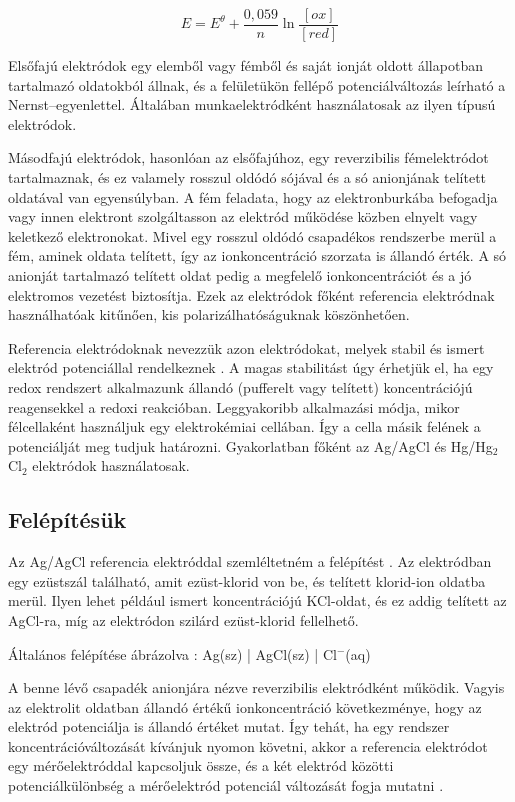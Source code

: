 \begin{equation}
E = E^\theta + \frac{0,059}{n}\ln \frac{[ox]}{[red]}
\label{eq:nernst}
\end{equation}

Elsőfajú elektródok egy elemből vagy fémből és saját ionját oldott állapotban tartalmazó oldatokból állnak, és a felületükön fellépő potenciálváltozás leírható a Nernst--egyenlettel. Általában munkaelektródként használatosak az ilyen típusú elektródok.

Másodfajú elektródok, hasonlóan az elsőfajúhoz, egy reverzibilis fémelektródot tartalmaznak, és ez valamely rosszul oldódó sójával és a só anionjának telített oldatával van egyensúlyban. A fém feladata, hogy az elektronburkába befogadja vagy innen elektront szolgáltasson az elektród működése közben elnyelt vagy keletkező elektronokat. Mivel egy rosszul oldódó csapadékos rendszerbe merül a fém, aminek oldata telített, így az ionkoncentráció szorzata is állandó érték. A só anionját tartalmazó telített oldat pedig a megfelelő ionkoncentrációt és a jó elektromos vezetést biztosítja. Ezek az elektródok főként referencia elektródnak használhatóak kitűnően, kis polarizálhatóságuknak köszönhetően.

Referencia elektródoknak nevezzük azon elektródokat, melyek stabil és ismert elektród potenciállal rendelkeznek \cite{allen2001electrochemical}. A magas stabilitást úgy érhetjük el, ha egy redox rendszert alkalmazunk állandó (pufferelt vagy telített) koncentrációjú reagensekkel a redoxi reakcióban. Leggyakoribb alkalmazási módja, mikor félcellaként használjuk egy elektrokémiai cellában. Így a cella másik felének a potenciálját meg tudjuk határozni. Gyakorlatban főként az Ag/AgCl és Hg/Hg$_2$Cl$_2$ elektródok használatosak. 

\subsection{Felépítésük}

Az Ag/AgCl referencia elektróddal szemléltetném a felépítést \cite{janz1968silver}. Az elektródban egy ezüstszál található, amit ezüst-klorid von be, és telített klorid-ion oldatba merül. Ilyen lehet például ismert koncentrációjú KCl-oldat, és ez addig telített az AgCl-ra, míg az elektródon szilárd ezüst-klorid fellelhető.


Általános felépítése ábrázolva : Ag(sz) | AgCl(sz) | Cl$^-$(aq)


A benne lévő csapadék anionjára nézve reverzibilis elektródként működik. Vagyis az elektrolit oldatban állandó értékű ionkoncentráció következménye, hogy az elektród potenciálja is állandó értéket mutat. Így tehát, ha egy rendszer koncentrációváltozását kívánjuk nyomon követni, akkor a referencia elektródot egy mérőelektróddal kapcsoljuk össze, és a két elektród közötti potenciálkülönbség a mérőelektród potenciál változását fogja mutatni \cite{harris2010quantitative}.

